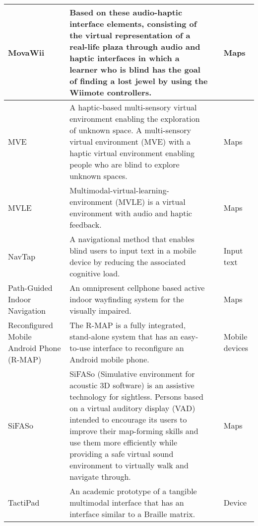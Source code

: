 \begin{small}
\begin{longtable}[h]{m{2.7cm}m{7cm}m{3cm}m{2cm}}
            MovaWii & Based on these audio-haptic interface elements, consisting of the virtual representation of a real-life plaza through audio and haptic interfaces in which a learner who is blind has the goal of finding a lost jewel by using the Wiimote controllers. & {\tiny \cite{Sanchez2014Multimodal,SanchezVideogaming}} & Maps \\ \hline
            
            MVE & A haptic-based multi-sensory virtual environment enabling the exploration of unknown space. A multi-sensory virtual environment (MVE) with a haptic virtual environment enabling people who are blind to explore unknown spaces. & {\tiny \cite{Lahav2008Construction,Lahav2004}} & Maps \\ \hline
            
            MVLE & Multimodal-virtual-learning-environment (MVLE) is a virtual environment with audio and haptic feedback. & {\tiny \cite{Lahav2005}} & Maps \\ \hline
            
            NavTap & A navigational method that enables blind users to input text in a mobile device by reducing the associated cognitive load. & {\tiny \cite{Guerreiro2009}} & Input text \\ \hline
            
            Path-Guided Indoor Navigation & An omnipresent cellphone based active indoor wayfinding system for the visually impaired. & {\tiny \cite{Jain2014}} & Maps \\ \hline
            
            Reconfigured Mobile Android Phone (R-MAP) & The R-MAP is a fully integrated, stand-alone system that has an easy-to-use interface to reconfigure an Android mobile phone. & {\tiny \cite{Hossain2011}} & Mobile devices \\ \hline
            
            SiFASo & SiFASo (Simulative environment for acoustic 3D software) is an assistive technology for sightless. Persons based on a virtual auditory display (VAD) intended to encourage its users to improve their map-forming skills and use them more efficiently while providing a safe virtual sound environment to virtually walk and navigate through. & {\tiny \cite{Ohuchi2006}} & Maps \\ \hline
            
            TactiPad & An academic prototype of a tangible multimodal interface that has an interface similar to a Braille matrix. & {\tiny \cite{Pissaloux2018a}} & Device \\ \hline
            

\end{longtable}
\end{small}
